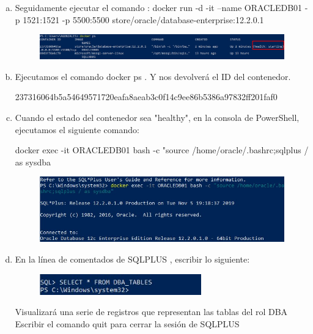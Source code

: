 \documentclass[preprint,12pt]{elsarticle}
\begin{document}
\begin{enumerate}[a)]
\item Seguidamente ejecutar el comando :\newline
docker run -d -it --name ORACLEDB01 -p 1521:1521 -p 5500:5500 store/oracle/database-enterprise:12.2.0.1
\begin{figure}[htb]
	\begin{center}
		\includegraphics[width=12cm]{./IMAGENES/Docker8_11}
	\end{center}
\end{figure}
\item Ejecutamos el comando docker ps . Y nos devolverá el ID del contenedor.
\begin{center}
237316064b5a54649571720eafa8aeab3c0f14c9ee86b5386a97832ff201faf0
\end{center}

\item Cuando el estado del contenedor sea "healthy", en la consola de PowerShell, ejecutamos el siguiente comando:
\begin{center} docker exec -it ORACLEDB01 bash -c "source /home/oracle/.bashrc;sqlplus / as sysdba \end{center}
\begin{figure}[htb]
	\begin{center}
		\includegraphics[width=12cm]{./IMAGENES/Docker8_08}
	\end{center}
\end{figure}

\item En la línea de comentados de SQLPLUS , escribir lo siguiente:
\begin{figure}[htb]
	\begin{center}
		\includegraphics[width=7cm]{./IMAGENES/Docker8_12}
	\end{center}
\end{figure}
Visualizará una serie de registros que representan las tablas del rol DBA\newline
Escribir el comando quit para cerrar la sesión de SQLPLUS


\end{enumerate}
\end{document}
